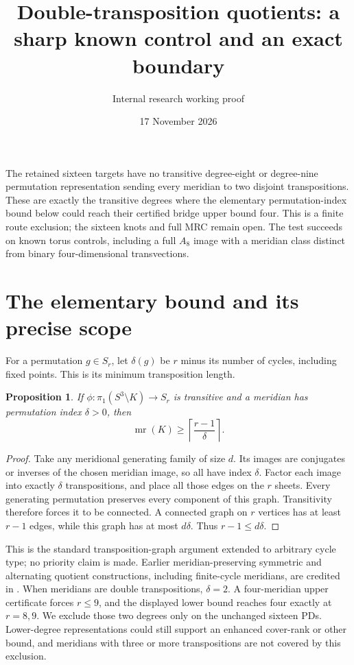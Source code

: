 \documentclass[11pt]{article}
\title{Double-transposition quotients: a sharp known control and an exact boundary}
\author{Internal research working proof}
\date{17 November 2026}
\newtheorem{proposition}[theorem]{Proposition}
\newcommand{\mr}{\operatorname{mr}}
\begin{document}
\maketitle

The retained sixteen targets have no transitive degree-eight or
degree-nine permutation representation sending every meridian to
two disjoint transpositions. These are exactly the transitive
degrees where the elementary permutation-index bound below could
reach their certified bridge upper bound four. This is a finite
route exclusion; the sixteen knots and full MRC remain open.
The test succeeds on known torus controls, including a full
$A_8$ image with a meridian class distinct from binary
four-dimensional transvections.

\section{The elementary bound and its precise scope}

For a permutation $g\in S_r$, let $\delta(g)$ be $r$ minus its
number of cycles, including fixed points. This is its minimum
transposition length.
\begin{proposition}
If $\phi:\pi_1(S^3\setminus K)\to S_r$ is transitive and a
meridian has permutation index $\delta>0$, then
\[
                 \mr(K)\ge\left\lceil\frac{r-1}{\delta}\right\rceil.
\]
\end{proposition}
\begin{proof}
Take any meridional generating family of size $d$. Its images
are conjugates or inverses of the chosen meridian image, so all
have index $\delta$. Factor each image into exactly $\delta$
transpositions, and place all those edges on the $r$ sheets.
Every generating permutation preserves every component of this
graph. Transitivity therefore forces it to be connected. A
connected graph on $r$ vertices has at least $r-1$ edges, while
this graph has at most $d\delta$. Thus $r-1\le d\delta$.
\end{proof}

This is the standard transposition-graph argument extended to
arbitrary cycle type; no priority claim is made. Earlier
meridian-preserving symmetric and alternating quotient
constructions, including finite-cycle meridians, are credited
in \cite{bk,jp}. When meridians are double transpositions,
$\delta=2$. A four-meridian upper certificate forces $r\le9$,
and the displayed lower bound reaches four exactly at $r=8,9$.
We exclude those two degrees only on the unchanged sixteen
PDs. Lower-degree representations could still support an
enhanced cover-rank or other bound, and meridians with three
or more transpositions are not covered by this exclusion.
\end{document}
